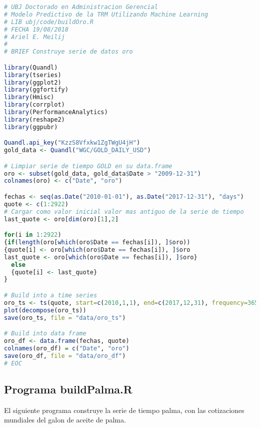 \begin{lstlisting}[language=R]
# UBJ Doctorado en Administracion Gerencial
# Modelo Predictivo de la TRM Utilizando Machine Learning
# LIB ubj/code/buildOro.R
# FECHA 19/08/2018
# Ariel E. Meilij
#
# BRIEF Construye serie de datos oro

library(Quandl)
library(tseries)
library(ggplot2)
library(ggfortify)
library(Hmisc)
library(corrplot)
library(PerformanceAnalytics)
library(reshape2)
library(ggpubr)

Quandl.api_key("KzzS8Vfxkw1ZgTWgU4jH")
gold_data <- Quandl("WGC/GOLD_DAILY_USD")

# Limpiar serie de tiempo GOLD en su data.frame
oro <- subset(gold_data, gold_data$Date > "2009-12-31")
colnames(oro) <- c("Date", "oro")

fechas <- seq(as.Date("2010-01-01"), as.Date("2017-12-31"), "days")
quote <- c(1:2922)
# Cargar como valor inicial valor mas antiguo de la serie de tiempo
last_quote <- oro[dim(oro)[1],2]

for(i in 1:2922)
{if(length(oro[which(oro$Date == fechas[i]), ]$oro))
{quote[i] <- oro[which(oro$Date == fechas[i]), ]$oro
last_quote <- oro[which(oro$Date == fechas[i]), ]$oro}
  else
  {quote[i] <- last_quote}
}

# Build into a time series
oro_ts <- ts(quote, start=c(2010,1,1), end=c(2017,12,31), frequency=365)
plot(decompose(oro_ts))
save(oro_ts, file = "data/oro_ts")

# Build into data frame
oro_df <- data.frame(fechas, quote)
colnames(oro_df) = c("Date", "oro")
save(oro_df, file = "data/oro_df")
# EOC
\end{lstlisting}

\subsection{Programa buildPalma.R}
El siguiente programa construye la serie de tiempo palma, con las cotizaciones mundiales del galon de aceite de palma.

